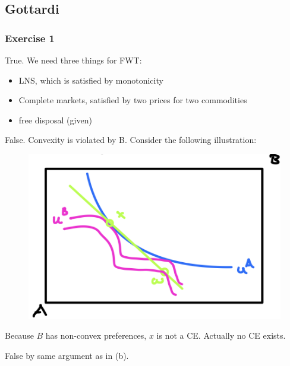 \newpage
{
\subsection*{Gottardi}

\subsubsection*{Exercise 1}

\begin{enumerate}[label=(\alph*)]
{\item 
True. We need three things for FWT:

\begin{itemize}
    \item LNS, which is satisfied by monotonicity
    \item Complete markets, satisfied by two prices for two commodities
    \item free disposal (given)
\end{itemize}
}
{\item 
False. Convexity is violated by B. Consider the following illustration:

\begin{figure}[!ht]
    \centering
    \includegraphics[width=0.75\linewidth]{images/2014_15_1.png}    
\end{figure}

Because $B$ has non-convex preferences, $x$ is not a CE. Actually no CE exists.
}
{\item 
False by same argument as in (b).
}
\end{enumerate}
}
